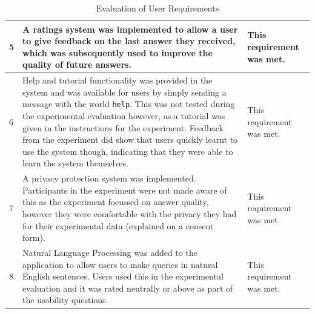 \documentclass[authoryearcitations]{UoYCSproject}
\begin{document}
\begin{table}[h]
\begin{tabular}{|p{0.4cm}|p{9.0cm}|p{4.0cm}|}
5  & A ratings system was implemented to allow a user to give feedback on the last answer they received, which was subsequently used to improve the quality of future answers.                                                                                                                                                                                                                                                                 & This requirement was met.           \\ \hline
6  & Help and tutorial functionality was provided in the system and was available for users by simply sending a message with the world \texttt{help}. This was not tested during the experimental evaluation however, as a tutorial was given in the instructions for the experiment. Feedback from the experiment did show that users quickly learnt to use the system though, indicating that they were able to learn the system themselves. & This requirement was met.           \\ \hline
7  & A privacy protection system was implemented. Participants in the experiment were not made aware of this as the experiment focussed on answer quality, however they were comfortable with the privacy they had for their experimental data (explained on a consent form).                                                                                                                                                                  & This requirement was met.           \\ \hline
8  & Natural Language Processing was added to the application to allow users to make queries in natural English sentences. Users used this in the experimental evaluation and it was rated neutrally or above as part of the usability questions.                                                                                                                                                                                              & This requirement was met.           \\ \hline
\end{tabular}
\caption{Evaluation of User Requirements}
\label{table:evalUserReqs}
\end{table}
\end{document}
